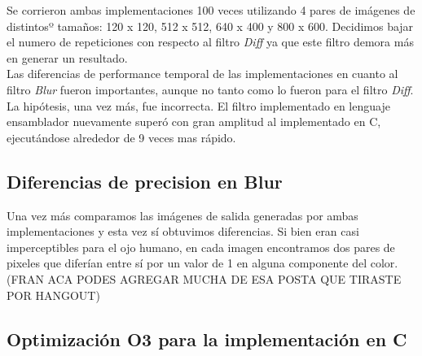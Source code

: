 \documentclass[10pt,a4paper,spanish]{article}
\begin{document}
Se corrieron ambas implementaciones 100 veces utilizando 4 pares de imágenes de distintosº tamaños: 120 x 120, 512 x 512, 640 x 400 y 800 x 600. Decidimos bajar el numero de repeticiones con respecto al filtro \textit{Diff} ya que este filtro demora más en generar un resultado.\\

Las diferencias de performance temporal de las implementaciones en cuanto al filtro \textit{Blur} fueron importantes, aunque no tanto como lo fueron para el filtro \textit{Diff}. La hipótesis, una vez más, fue incorrecta. El filtro implementado en lenguaje ensamblador nuevamente superó con gran amplitud al implementado en C, ejecutándose alrededor de 9 veces mas rápido. \\


\subsection{Diferencias de precision en Blur}

Una vez más comparamos las imágenes de salida generadas por ambas implementaciones y esta vez sí obtuvimos diferencias. Si bien eran casi imperceptibles para el ojo humano, en cada imagen encontramos dos pares de pixeles que diferían entre sí por un valor de 1 en alguna componente del color. (FRAN ACA PODES AGREGAR MUCHA DE ESA POSTA QUE TIRASTE POR HANGOUT)

\subsection{Optimización O3 para la implementación en C}
\end{document}
